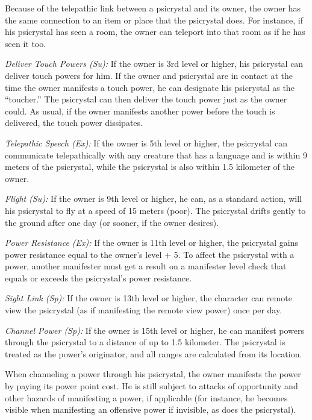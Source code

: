 Because of the telepathic link between a psicrystal and its owner, the owner has the same connection to an item or place that the psicrystal does. For instance, if his psicrystal has seen a room, the owner can teleport into that room as if he has seen it too.

\textit{Deliver Touch Powers (Su):} If the owner is 3rd level or higher, his psicrystal can deliver touch powers for him. If the owner and psicrystal are in contact at the time the owner manifests a touch power, he can designate his psicrystal as the ``toucher.'' The psicrystal can then deliver the touch power just as the owner could. As usual, if the owner manifests another power before the touch is delivered, the touch power dissipates.

\textit{Telepathic Speech (Ex):} If the owner is 5th level or higher, the psicrystal can communicate telepathically with any creature that has a language and is within 9 meters of the psicrystal, while the psicrystal is also within 1.5 kilometer of the owner.

\textit{Flight (Su):} If the owner is 9th level or higher, he can, as a standard action, will his psicrystal to fly at a speed of 15 meters (poor). The psicrystal drifts gently to the ground after one day (or sooner, if the owner desires).

\textit{Power Resistance (Ex):} If the owner is 11th level or higher, the psicrystal gains power resistance equal to the owner's level + 5. To affect the psicrystal with a power, another manifester must get a result on a manifester level check that equals or exceeds the psicrystal's power resistance.

\textit{Sight Link (Sp):} If the owner is 13th level or higher, the character can remote view the psicrystal (as if manifesting the remote view power) once per day.

\textit{Channel Power (Sp):} If the owner is 15th level or higher, he can manifest powers through the psicrystal to a distance of up to 1.5 kilometer. The psicrystal is treated as the power's originator, and all ranges are calculated from its location.

When channeling a power through his psicrystal, the owner manifests the power by paying its power point cost. He is still subject to attacks of opportunity and other hazards of manifesting a power, if applicable (for instance, he becomes visible when manifesting an offensive power if invisible, as does the psicrystal).


